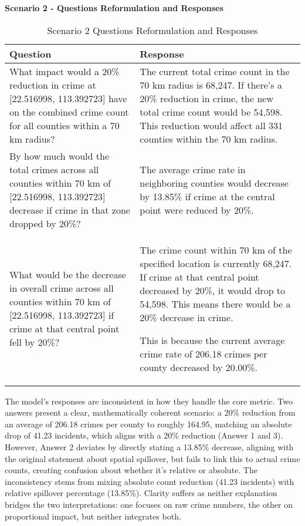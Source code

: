 \noindent \textbf{Scenario 2 - Questions Reformulation and Responses}
\begin{table}[hbtp]
\centering
\small
\begin{tabular}{|p{}|p{}|}
\hline
\textbf{Question} & \textbf{Response} \\
\hline
What impact would a 20\% reduction in crime at [22.516998, 113.392723] have on the combined crime count for all counties within a 70 km radius? & The current total crime count in the 70 km radius is 68,247. If there's a 20\% reduction in crime, the new total crime count would be 54,598. This reduction would affect all 331 counties within the 70 km radius. \\
\hline
 By how much would the total crimes across all counties within 70 km of [22.516998, 113.392723] decrease if crime in that zone dropped by 20\%? & The average crime rate in neighboring counties would decrease by 13.85\% if crime at the central point were reduced by 20\%. \\
\hline
What would be the decrease in overall crime across all counties within 70 km of [22.516998, 113.392723] if crime at that central point fell by 20\%? & 
The crime count within 70 km of the specified location is currently 68,247. If crime at that central point decreased by 20\%, it would drop to 54,598. This means there would be a 20\% decrease in crime.

This is because the current average crime rate of 206.18 crimes per county decreased by 20.00\%. \\
\hline
\end{tabular}
\caption{Scenario 2 Questions Reformulation and Responses}
\label{tab:questions_responses_2}
\end{table}

The model's responses are inconsistent in how they handle the core metric. Two answers present a clear, mathematically coherent scenario: a 20\% reduction from an average of 206.18 crimes per county to roughly 164.95, matching an absolute drop of 41.23 incidents, which aligns with a 20\% reduction (Answer 1 and 3). However, Answer 2 deviates by directly stating a 13.85\% decrease, aligning with the original statement about spatial spillover, but fails to link this to actual crime counts, creating confusion about whether it's relative or absolute. The inconsistency stems from mixing absolute count reduction (41.23 incidents) with relative spillover percentage (13.85\%). Clarity suffers as neither explanation bridges the two interpretations: one focuses on raw crime numbers, the other on proportional impact, but neither integrates both.


